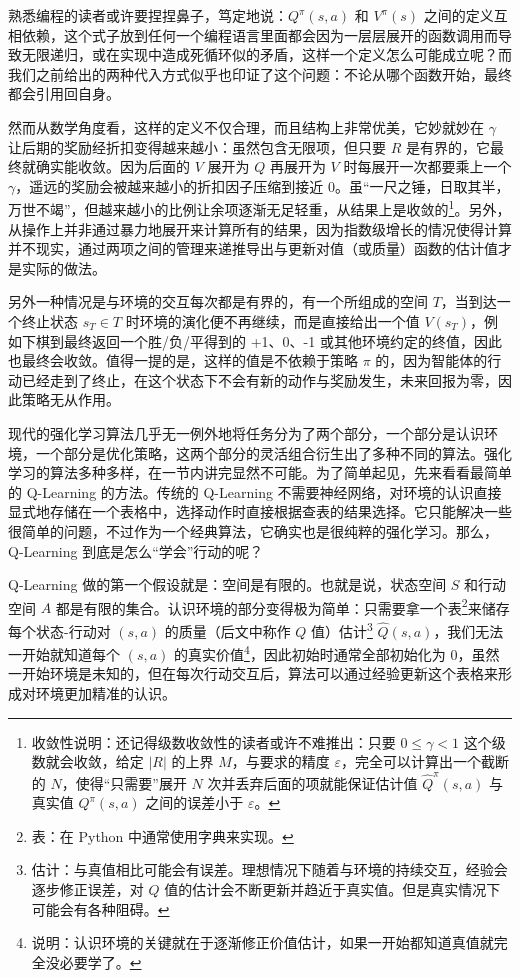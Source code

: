 熟悉编程的读者或许要捏捏鼻子，笃定地说：$Q^\pi (s, a)$ 和 $V^\pi (s)$ 之间的定义互相依赖，这个式子放到任何一个编程语言里面都会因为一层层展开的函数调用而导致无限递归，或在实现中造成死循环似的矛盾，这样一个定义怎么可能成立呢？而我们之前给出的两种代入方式似乎也印证了这个问题：不论从哪个函数开始，最终都会引用回自身。

然而从数学角度看，这样的定义不仅合理，而且结构上非常优美，它妙就妙在 $\gamma$ 让后期的奖励经折扣变得越来越小：虽然包含无限项，但只要 $R$ 是有界的，它最终就确实能收敛。因为后面的 $V$ 展开为 $Q$ 再展开为 $V$ 时每展开一次都要乘上一个 $\gamma$，遥远的奖励会被越来越小的折扣因子压缩到接近 $0$。虽“一尺之锤，日取其半，万世不竭”，但越来越小的比例让余项逐渐无足轻重，从结果上是收敛的\footnote{收敛性说明：还记得级数收敛性的读者或许不难推出：只要 $0 \le \gamma < 1$ 这个级数就会收敛，给定 $|R|$ 的上界 $M$，与要求的精度 $\varepsilon$，完全可以计算出一个截断的 $N$，使得“只需要”展开 $N$ 次并丢弃后面的项就能保证估计值 $\hat Q^\pi (s, a)$ 与真实值 $Q^\pi (s, a)$ 之间的误差小于 $\varepsilon$。}。另外，从操作上并非通过暴力地展开来计算所有的结果，因为指数级增长的情况使得计算并不现实，通过两项之间的管理来递推导出与更新对值（或质量）函数的估计值才是实际的做法。

另外一种情况是与环境的交互每次都是有界的，有一个所组成的空间 $T$，当到达一个终止状态 $s_T \in T$ 时环境的演化便不再继续，而是直接给出一个值 $V(s_T)$，例如下棋到最终返回一个胜/负/平得到的 +1、0、-1 或其他环境约定的终值，因此也最终会收敛。值得一提的是，这样的值是不依赖于策略 $\pi$ 的，因为智能体的行动已经走到了终止，在这个状态下不会有新的动作与奖励发生，未来回报为零，因此策略无从作用。

现代的强化学习算法几乎无一例外地将任务分为了两个部分，一个部分是认识环境，一个部分是优化策略，这两个部分的灵活组合衍生出了多种不同的算法。强化学习的算法多种多样，在一节内讲完显然不可能。为了简单起见，先来看看最简单的 Q-Learning 的方法。传统的 Q-Learning 不需要神经网络，对环境的认识直接显式地存储在一个表格中，选择动作时直接根据查表的结果选择。它只能解决一些很简单的问题，不过作为一个经典算法，它确实也是很纯粹的强化学习。那么，Q-Learning 到底是怎么“学会”行动的呢？

Q-Learning 做的第一个假设就是：空间是有限的。也就是说，状态空间 $S$ 和行动空间 $A$ 都是有限的集合。认识环境的部分变得极为简单：只需要拿一个表\footnote{表：在 Python 中通常使用字典来实现。}来储存每个状态-行动对 $(s, a)$ 的质量（后文中称作 $Q$ 值）估计\footnote{估计：与真值相比可能会有误差。理想情况下随着与环境的持续交互，经验会逐步修正误差，对 $Q$ 值的估计会不断更新并趋近于真实值。但是真实情况下可能会有各种阻碍。} $\hat Q(s, a)$，我们无法一开始就知道每个 $(s, a)$ 的真实价值\footnote{说明：认识环境的关键就在于逐渐修正价值估计，如果一开始都知道真值就完全没必要学了。}，因此初始时通常全部初始化为 0，虽然一开始环境是未知的，但在每次行动交互后，算法可以通过经验更新这个表格来形成对环境更加精准的认识。

